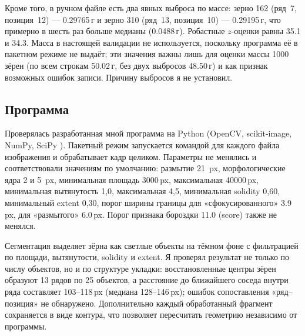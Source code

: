 \documentclass[12pt,a4paper]{article}
\begin{document}
\begin{table}[htbp]
\centering\footnotesize
\setlength{\tabcolsep}{3pt}
\caption{Сводка ручных измерений (число заполненных строк $n = 324$;
длина, ширина и толщина — в мм, масса — в г).}
\label{tab:manual}

\end{table}

Кроме того, в ручном файле есть два явных выброса по массе: зерно 162
(ряд~7, позиция~12) — \num{0.29765}\,г и зерно 310 (ряд~13,
позиция~10) — \num{0.29195}\,г, что примерно в шесть раз больше медианы
(\num{0.0488}\,г). Робастные $z$-оценки равны \num{35.1} и \num{34.3}.
Масса в настоящей валидации не используется, поскольку программа её в
пакетном режиме не выдаёт; эти значения важны лишь для оценки массы
1000 зёрен (по всем строкам \num{50.02}\,г, без двух выбросов
\num{48.50}\,г) и как признак возможных ошибок записи. Причину выбросов
я не установил.

\subsection{Программа}

Проверялась разработанная мной программа на Python (OpenCV,
scikit-image, NumPy, SciPy \cite{bradski2000,vanderwalt2014,harris2020,virtanen2020}).
Пакетный режим запускается командой для каждого файла изображения и
обрабатывает кадр целиком. Параметры не менялись и соответствовали
значениям по умолчанию: размытие 21~px, морфологические ядра 2 и 5~px,
минимальная площадь \num{3000}\,px, максимальная \num{40000}\,px,
минимальная вытянутость 1{,}0, максимальная 4{,}5, минимальная
solidity 0{,}60, минимальный extent 0{,}30, порог ширины границы для
«сфокусированного» \num{3.9}\,px, для «размытого» \num{6.0}\,px.
Порог признака бороздки \num{11.0} (score) также не менялся.

Сегментация выделяет зёрна как светлые объекты на тёмном фоне с
фильтрацией по площади, вытянутости, solidity и extent. Я проверял
результат не только по числу объектов, но и по структуре укладки:
восстановленные центры зёрен образуют 13 рядов по 25 объектов, а
расстояние до ближайшего соседа внутри ряда составляет
\num{103}--\num{118}\,px (медиана \num{128}--\num{146}\,px); ошибок
сопоставления «ряд--позиция» не обнаружено. Дополнительно каждый
обработанный фрагмент сохраняется в виде контура, что позволяет
пересчитать геометрию независимо от программы.
\end{document}

